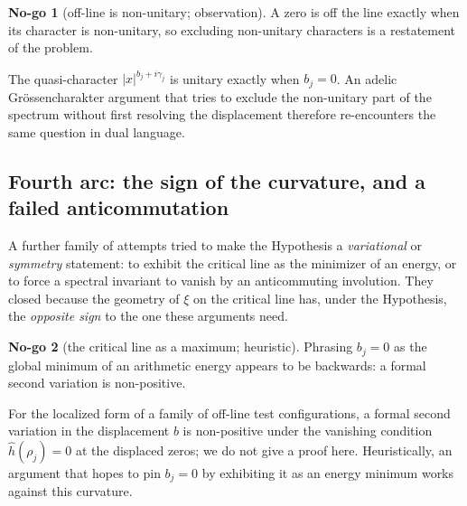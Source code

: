 \documentclass[11pt]{amsart}
\theoremstyle{definition}
\theoremstyle{remark}
\theoremstyle{definition}
\newtheorem{nogo}{No-go}[section]
\begin{document}
\begin{nogo}[off-line is non-unitary; observation]\label{ng:twolang}
A zero is off the line exactly when its character is non-unitary, so excluding non-unitary characters is a
restatement of the problem.
\end{nogo}
\noindent The quasi-character $|x|^{b_j+i\gamma_j}$ is unitary exactly when $b_j=0$. An adelic
Gr\"ossencharakter argument that tries to exclude the non-unitary part of the spectrum without first
resolving the displacement therefore re-encounters the same question in dual language.

\subsection{Fourth arc: the sign of the curvature, and a failed anticommutation}\label{sec:arcD}

A further family of attempts tried to make the Hypothesis a \emph{variational} or \emph{symmetry} statement:
to exhibit the critical line as the minimizer of an energy, or to force a spectral invariant to vanish by an
anticommuting involution. They closed because the geometry of $\xi$ on the critical line has, under the
Hypothesis, the \emph{opposite sign} to the one these arguments need.

\begin{nogo}[the critical line as a maximum; heuristic]\label{ng:extremum}
Phrasing $b_j=0$ as the global minimum of an arithmetic energy appears to be backwards: a formal second
variation is non-positive.
\end{nogo}
\noindent For the localized form of a family of off-line test configurations, a formal second variation in
the displacement $b$ is non-positive under the vanishing condition $\widehat h(\rho_j)=0$ at the displaced
zeros; we do not give a proof here. Heuristically, an argument that hopes to pin $b_j=0$ by exhibiting it
as an energy minimum works against this curvature.
\end{document}
